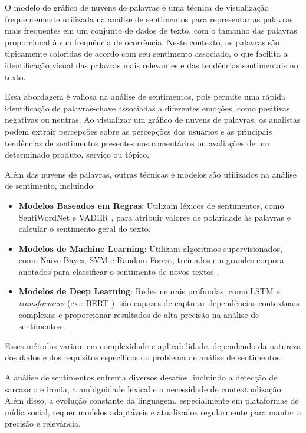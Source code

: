 O modelo de gráfico de nuvens de palavras é uma técnica de visualização frequentemente utilizada na análise de sentimentos para representar as palavras mais frequentes em um conjunto de dados de texto, com o tamanho das palavras proporcional à sua frequência de ocorrência. Neste contexto, as palavras são tipicamente coloridas de acordo com seu sentimento associado, o que facilita a identificação visual das palavras mais relevantes e das tendências sentimentais no texto.

Essa abordagem é valiosa na análise de sentimentos, pois permite uma rápida identificação de palavras-chave associadas a diferentes emoções, como positivas, negativas ou neutras. Ao visualizar um gráfico de nuvens de palavras, os analistas podem extrair percepções sobre as percepções dos usuários e as principais tendências de sentimentos presentes nos comentários ou avaliações de um determinado produto, serviço ou tópico.

Além das nuvens de palavras, outras técnicas e modelos são utilizados na análise de sentimento, incluindo:

\begin{itemize}
    \item \textbf{Modelos Baseados em Regras}: Utilizam léxicos de sentimentos, como SentiWordNet \cite{Baccianella2010} e VADER \cite{Hutto2014}, para atribuir valores de polaridade às palavras e calcular o sentimento geral do texto.
    \item \textbf{Modelos de Machine Learning}: Utilizam algoritmos supervisionados, como Naive Bayes, SVM e Random Forest, treinados em grandes corpora anotados para classificar o sentimento de novos textos \cite{Pang2002, Liu2012}.
    \item \textbf{Modelos de Deep Learning}: Redes neurais profundas, como LSTM e \textit{transformers} (ex.: BERT \cite{Devlin2019}), são capazes de capturar dependências contextuais complexas e proporcionar resultados de alta precisão na análise de sentimentos \cite{Zhang2018}.
\end{itemize}

Esses métodos variam em complexidade e aplicabilidade, dependendo da natureza dos dados e dos requisitos específicos do problema de análise de sentimentos.

A análise de sentimentos enfrenta diversos desafios, incluindo a detecção de sarcasmo e ironia, a ambiguidade lexical e a necessidade de contextualização. Além disso, a evolução constante da linguagem, especialmente em plataformas de mídia social, requer modelos adaptáveis e atualizados regularmente para manter a precisão e relevância.

